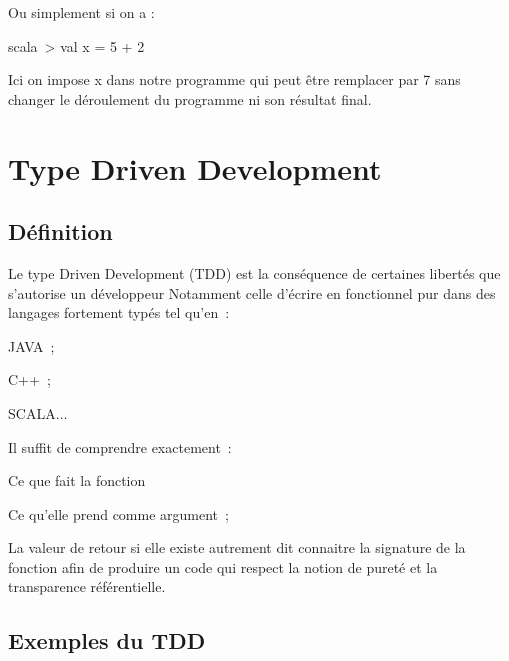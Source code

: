 \documentclass[12pt]{article}
\begin{document}

\par

Ou simplement si on a : \par

scala\ > val  x = 5 + 2 \par

Ici on impose x dans notre programme qui peut être remplacer par 7 sans changer le déroulement du programme ni son résultat final.\par

\section*{Type Driven Development}
\subsection*{Définition }
Le type Driven Development (TDD) est la conséquence de certaines libertés que s’autorise un développeur Notamment celle d’écrire en fonctionnel pur dans des langages fortement typés tel qu’en :\par

JAVA ;\par

C++ ;\par

SCALA$ \ldots $ \par

Il suffit de comprendre exactement :\par

Ce que fait la fonction\par

Ce qu’elle prend comme argument ;\par

La valeur de retour si elle existe autrement dit connaitre la signature de la fonction afin de produire un code qui respect la notion de pureté et la transparence référentielle.\par


\vspace{\baselineskip}
\subsection*{Exemples du TDD}
\end{document}
